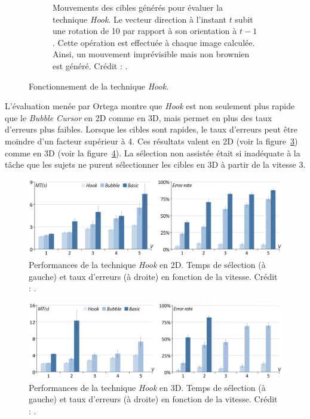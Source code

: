 \begin{figure}[!htb]
\begin{subfigure}{.69\textwidth}
			\caption[\emph{Hook} -- mouvements des cibles]{Mouvements des cibles générés pour évaluer la technique \emph{Hook}. Le vecteur direction à l'instant $t$ subit une rotation de 10\textdegree{} par rapport à son orientation à $t-1$. Cette opération est effectuée à chaque image calculée. Ainsi, un mouvement imprévisible mais non brownien est généré. Crédit : \cite{ortega2013hook}.}
			\label{fig:hookDir}
		\end{subfigure}
		\caption[\emph{Hook} -- fonctionnement]{Fonctionnement de la technique \emph{Hook}.}
		\label{fig:hook}
	\end{figure}
	
	L'évaluation menée par Ortega montre que \emph{Hook} est non seulement plus rapide que le \emph{Bubble Cursor} en 2D comme en 3D, mais permet en plus des taux d'erreurs plus faibles. Lorsque les cibles sont rapides, le taux d'erreurs peut être moindre d'un facteur supérieur à 4. Ces résultats valent en 2D (voir la figure~\ref{fig:hookRes2d}) comme en 3D (voir la figure~\ref{fig:hookRes3d}). La sélection non assistée était si inadéquate à la tâche que les sujets ne purent sélectionner les cibles en 3D à partir de la vitesse 3.

	\begin{figure}[!htb]
		\centering
		\includegraphics[width=\textwidth]{figures/ch2/hookRes2d}
		\caption[\emph{Hook} -- performances en 2D]{Performances de la technique \emph{Hook} en 2D. Temps de sélection (à gauche) et taux d'erreurs (à droite) en fonction de la vitesse. Crédit : \cite{ortega2013hook}.}
		\label{fig:hookRes2d}
	\end{figure}
	
	\begin{figure}[!htb]
		\centering
		\includegraphics[width=\textwidth]{figures/ch2/hookRes3d}
		\caption[\emph{Hook} -- performances en 2D]{Performances de la technique \emph{Hook} en 3D. Temps de sélection (à gauche) et taux d'erreurs (à droite) en fonction de la vitesse. Crédit : \cite{ortega2013hook}.}
		\label{fig:hookRes3d}
	\end{figure}
	
